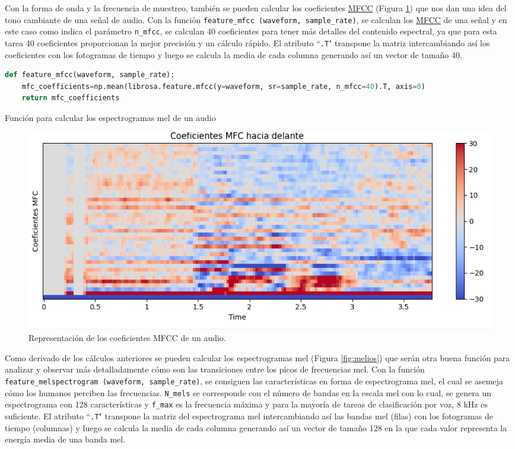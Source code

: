 Con la forma de onda y la frecuencia de muestreo, también se pueden calcular los coeficientes \hyperlink{MFCC}{MFCC} (Figura \ref{fig:mfcc}) que nos dan una idea del tono cambiante de una señal de audio. Con la función \verb|feature_mfcc (waveform, sample_rate)|, se calculan los \hyperlink{MFCC}{MFCC} de una señal y en este caso como indica el parámetro \texttt{n\_mfcc}, se calculan 40 coeficientes para tener más detalles del contenido espectral, ya que para esta tarea 40 coeficientes proporcionan la mejor precisión y un cálculo rápido. El atributo ``\texttt{.T}" transpone la matriz intercambiando así los coeficientes con los fotogramas de tiempo y luego se calcula la media de cada columna generando así un vector de tamaño 40.


\begin{code}[H]
\begin{lstlisting}[language=Python]
def feature_mfcc(waveform, sample_rate):
    mfc_coefficients=np.mean(librosa.feature.mfcc(y=waveform, sr=sample_rate, n_mfcc=40).T, axis=0)
    return mfc_coefficients
\end{lstlisting}
\caption[Función para calcular los espectrogramas mel de un audio]{Función para calcular los espectrogramas mel de un audio}
\label{cod:codejemplo5}
\end{code}

\begin{figure}[H]
  \centering
  \includegraphics[scale=0.4]{figs/coeficientes_mfc} %
  \caption{ Representación de los coeficientes MFCC de un audio.}
  \label{fig:mfcc}
\end{figure}

Como derivado de los cálculos anteriores se pueden calcular los espectrogramas mel (Figura \ref{fig:melios}) que serán otra buena función para analizar y observar más detalladamente cómo son las transiciones entre los picos de frecuencias mel. Con la función \verb|feature_melspectrogram (waveform, sample_rate)|, se consiguen las características en forma de espectrograma mel, el cual se asemeja cómo los humanos perciben las frecuencias. \texttt{N\_mels} se corresponde con el número de bandas en la escala mel con lo cual, se genera un espectrograma con 128 características y \texttt{f\_max} es la frecuencia máxima y para la mayoría de tareas de clasificación por voz, 8 kHz es suficiente. El atributo ``\texttt{.T}" transpone la matriz del espectrograma mel intercambiando así las bandas mel (filas) con los fotogramas de tiempo (columnas) y luego se calcula la media de cada columna generando así un vector de tamaño 128 en la que cada valor representa la energía media de una banda mel.



